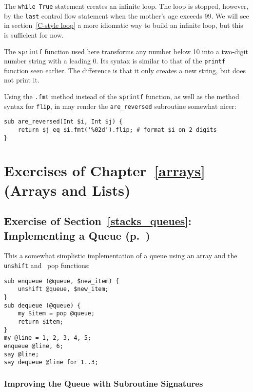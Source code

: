 The {\tt while True} statement creates an infinite loop. The 
loop is stopped, however, by the {\tt last} control flow 
statement when the mother's age exceeds 99. We will see 
in section~\ref{C-style loop} a more idiomatic way to build 
an infinite loop, but this is sufficient for now.

The {\tt sprintf} function used here transforms any number 
below 10 into a two-digit number string with a leading 0. 
Its syntax is similar to that of the {\tt printf} function 
seen earlier. The difference is that it only creates a new 
string, but does not print it.

Using the \verb'.fmt' method instead of the {\tt sprintf} 
function, as well as the method syntax for {\tt flip}, in 
may render the \verb'are_reversed' subroutine somewhat  
nicer:

\begin{verbatim}
sub are_reversed(Int $i, Int $j) {
    return $j eq $i.fmt('%02d').flip; # format $i on 2 digits
}
\end{verbatim}


\section{Exercises of Chapter~\ref{arrays} (Arrays and Lists)}

\subsection{Exercise of Section~\ref{stacks_queues}: Implementing a Queue (p.~\pageref{exercise_queue})}
\label{sol_exercise_queue}

This a somewhat simplistic implementation of a queue using 
an array and the {\tt unshift} and {\ pop} functions:

\begin{verbatim}
sub enqueue (@queue, $new_item) {
    unshift @queue, $new_item;
}
sub dequeue (@queue) {
    my $item = pop @queue;
    return $item;
}
my @line = 1, 2, 3, 4, 5;
enqueue @line, 6;
say @line;
say dequeue @line for 1..3;
\end{verbatim}

\subsubsection{Improving the Queue with Subroutine Signatures}

